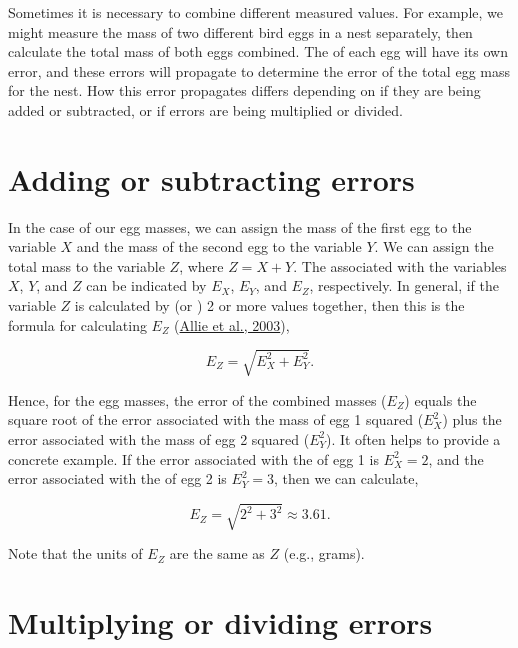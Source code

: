 \documentclass[
  openany]{krantz}
\begin{document}
Sometimes it is necessary to combine different measured values.
For example, we might measure the mass of two different bird eggs in a nest separately, then calculate the total mass of both eggs combined.
The  of each egg will have its own error, and these errors will propagate to determine the error of the total egg mass for the nest.
How this error propagates differs depending on if they are being added or subtracted, or if errors are being multiplied or divided.

\hypertarget{adding-or-subtracting-errors}{%
\section{Adding or subtracting errors}\label{adding-or-subtracting-errors}}

In the case of our egg masses, we can assign the mass of the first egg to the variable \(X\) and the mass of the second egg to the variable \(Y\).
We can assign the total mass to the variable \(Z\), where \(Z = X + Y\).
The  associated with the variables \(X\), \(Y\), and \(Z\) can be indicated by \(E_{X}\), \(E_{Y}\), and \(E_{Z}\), respectively.
In general, if the variable \(Z\) is calculated by  (or ) 2 or more values together, then this is the formula for calculating \(E_{Z}\) (\protect\hyperlink{ref-Allie2003}{Allie et al., 2003}),

\[E_{Z} = \sqrt{E^{2}_{X} + E^{2}_{Y}}.\]

Hence, for the egg masses, the error of the combined masses (\(E_{Z}\)) equals the square root of the error associated with the mass of egg 1 squared (\(E^{2}_{X}\)) plus the error associated with the mass of egg 2 squared (\(E^{2}_{Y}\)).
It often helps to provide a concrete example.
If the error associated with the  of egg 1 is \(E^{2}_{X} = 2\), and the error associated with the  of egg 2 is \(E^{2}_{Y} = 3\), then we can calculate,

\[E_{Z} = \sqrt{2^{2} + 3^{2}} \approx 3.61.\]

Note that the units of \(E_{Z}\) are the same as \(Z\) (e.g., grams).

\hypertarget{multiplying-or-dividing-errors}{%
\section{Multiplying or dividing errors}\label{multiplying-or-dividing-errors}}
\end{document}
